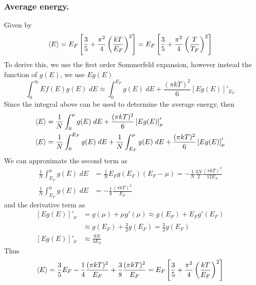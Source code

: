 \documentclass[../../../Main.tex]{subfiles}
\begin{document}
\subsubsection*{Average energy.} Given by 
\begin{equation*}
    \braket{E}=E_F\left[\frac{3}{5}+\frac{\pi^2}{4}\left(\frac{kT}{E_F}\right)^2\right]= E_F\left[\frac{3}{5}+\frac{\pi^2}{4}\left(\frac{T}{T_F}\right)^2\right]
\end{equation*}
To derive this, we use the first order Sommerfeld expansion, however instead the function of $g(E)$, we use $Eg(E)$
\begin{equation*}
    \int_{0}^{\infty}E f(E) g(E) \;dE \approx \int_{0}^{E_F} g(E) \;dE +  \frac{(\pi kT)^2}{6}\left[Eg(E)\right]'_{E_F}
\end{equation*}
Since the integral above can be used to determine the average energy, then 
\begin{align*}
    \braket{E}&=\frac{1}{N}\int_{0}^{\mu}g(E) \;dE+ \frac{(\pi kT)^2}{6}\left[Eg(E)\right]'_{\mu}\\
    \braket{E}&=\frac{1}{N}\int_{0}^{E_F}g(E) \;dE+ \frac{1}{N}\int_{E_F}^{\mu}g(E)\; dE+ \frac{(\pi kT)^2}{6}\left[Eg(E)\right]'_{\mu}
\end{align*}
We can approximate the second term as 
\begin{align*}
    \frac{1}{N}\int_{E_F}^{\mu}g(E) \;dE&=\frac{1}{N}E_Fg(E_F)(E_F-\mu) =-\frac{1}{N}\frac{3N}{2}\frac{(\pi kT)^2}{12E_F}\\
    \frac{1}{N}\int_{E_F}^{\mu}g(E) \;dE&=-\frac{1}{8}\frac{(\pi kT)^2}{E_F}
\end{align*}
and the derivative term as 
\begin{align*}
    \left[Eg(E)\right]'_{\mu}&=g(\mu)+\mu g'(\mu)\approx g(E_F)+E_Fg'(E_F)\\
    &\approx g(E_F)+\frac{3}{2}g(E_F)=\frac{3}{2}g(E_F)\\
    \left[Eg(E)\right]'_{\mu}&\approx\frac{9N}{4E_F}
\end{align*}
Thus 
\begin{align*}
    \braket{E}=\frac{3}{5}E_F-\frac{1}{4}\frac{(\pi kT)^2}{E_F}+\frac{3}{8}\frac{(\pi kT)^2}{E_F}=E_F\left[\frac{3}{5}+\frac{\pi^2}{4}\left(\frac{kT}{E_F}\right)^2\right]
\end{align*}
\end{document}
